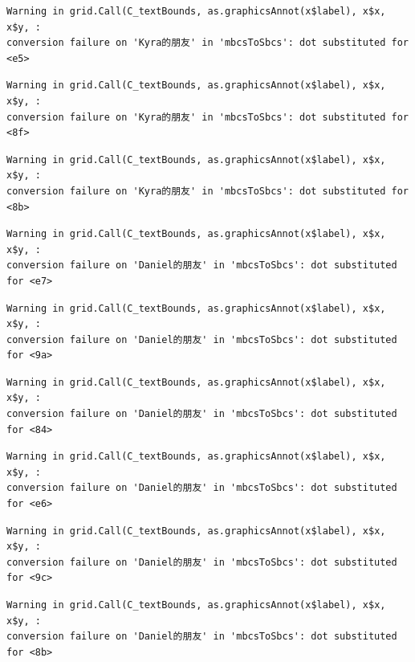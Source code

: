 \documentclass[
  letterpaper,
  DIV=11,
  numbers=noendperiod]{scrreprt}
\begin{document}
\begin{verbatim}
Warning in grid.Call(C_textBounds, as.graphicsAnnot(x$label), x$x, x$y, :
conversion failure on 'Kyra的朋友' in 'mbcsToSbcs': dot substituted for <e5>
\end{verbatim}

\begin{verbatim}
Warning in grid.Call(C_textBounds, as.graphicsAnnot(x$label), x$x, x$y, :
conversion failure on 'Kyra的朋友' in 'mbcsToSbcs': dot substituted for <8f>
\end{verbatim}

\begin{verbatim}
Warning in grid.Call(C_textBounds, as.graphicsAnnot(x$label), x$x, x$y, :
conversion failure on 'Kyra的朋友' in 'mbcsToSbcs': dot substituted for <8b>
\end{verbatim}

\begin{verbatim}
Warning in grid.Call(C_textBounds, as.graphicsAnnot(x$label), x$x, x$y, :
conversion failure on 'Daniel的朋友' in 'mbcsToSbcs': dot substituted for <e7>
\end{verbatim}

\begin{verbatim}
Warning in grid.Call(C_textBounds, as.graphicsAnnot(x$label), x$x, x$y, :
conversion failure on 'Daniel的朋友' in 'mbcsToSbcs': dot substituted for <9a>
\end{verbatim}

\begin{verbatim}
Warning in grid.Call(C_textBounds, as.graphicsAnnot(x$label), x$x, x$y, :
conversion failure on 'Daniel的朋友' in 'mbcsToSbcs': dot substituted for <84>
\end{verbatim}

\begin{verbatim}
Warning in grid.Call(C_textBounds, as.graphicsAnnot(x$label), x$x, x$y, :
conversion failure on 'Daniel的朋友' in 'mbcsToSbcs': dot substituted for <e6>
\end{verbatim}

\begin{verbatim}
Warning in grid.Call(C_textBounds, as.graphicsAnnot(x$label), x$x, x$y, :
conversion failure on 'Daniel的朋友' in 'mbcsToSbcs': dot substituted for <9c>
\end{verbatim}

\begin{verbatim}
Warning in grid.Call(C_textBounds, as.graphicsAnnot(x$label), x$x, x$y, :
conversion failure on 'Daniel的朋友' in 'mbcsToSbcs': dot substituted for <8b>
\end{verbatim}
\end{document}
